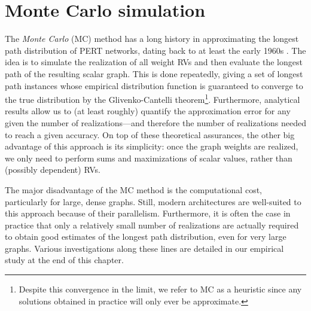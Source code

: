 \documentclass[12pt]{article}
\begin{document}

\section{Monte Carlo simulation}
\label{sect.monte_carlo} 


The {\em Monte Carlo} (MC) method has a long history in approximating the longest path distribution of PERT networks, dating back to at least the early 1960s \cite{van63}. The idea is to simulate the realization of all weight RVs and then evaluate the longest path of the resulting scalar graph. This is done repeatedly, giving a set of longest path instances whose empirical distribution function is guaranteed to converge to the true distribution by the Glivenko-Cantelli theorem\footnote{Despite this convergence in the limit, we refer to MC as a heuristic since any solutions obtained in practice will only ever be approximate.}. Furthermore, analytical results allow us to (at least roughly) quantify the approximation error for any given the number of realizations---and therefore the number of realizations needed to reach a given accuracy. On top of these theoretical assurances, the other big advantage of this approach is its simplicity: once the graph weights are realized, we only need to perform sums and maximizations of scalar values, rather than (possibly dependent) RVs.  

The major disadvantage of the MC method is the computational cost, particularly for large, dense graphs. Still, modern architectures are well-suited to this approach because of their parallelism. Furthermore, it is often the case in practice that only a relatively small number of realizations are actually required to obtain good estimates of the longest path distribution, even for very large graphs. Various investigations along these lines are detailed in our empirical study at the end of this chapter.  
\end{document}
